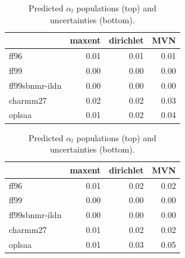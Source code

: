 \documentclass[12pt]{article}
\begin{document}
\begin{table}

\begin{tabular}{lrrr}
\toprule
{} &  maxent &  dirichlet &  MVN \\
\midrule
ff96           &    0.01 &       0.01 & 0.01 \\
ff99           &    0.00 &       0.00 & 0.00 \\
ff99sbnmr-ildn &    0.00 &       0.00 & 0.00 \\
charmm27          &    0.02 &       0.02 & 0.03 \\
oplsaa            &    0.01 &       0.02 & 0.04 \\
\bottomrule
\end{tabular}

\begin{tabular}{lrrr}
\toprule
{} &  maxent &  dirichlet &  MVN \\
\midrule
ff96           &    0.01 &       0.02 & 0.02 \\
ff99           &    0.00 &       0.00 & 0.00 \\
ff99sbnmr-ildn &    0.00 &       0.00 & 0.00 \\
charmm27          &    0.01 &       0.02 & 0.02 \\
oplsaa            &    0.01 &       0.03 & 0.05 \\
\bottomrule
\end{tabular}

\caption{
Predicted $\alpha_l$ populations (top) and uncertainties (bottom).  
}
\end{table}

\clearpage
\end{document}
